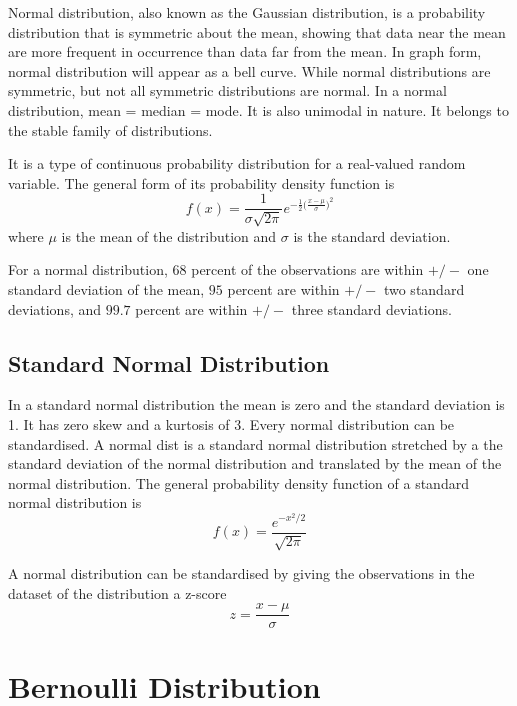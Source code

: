 \documentclass[14pt, a4paper]{article}
\theoremstyle{definition}
\begin{document}
  
Normal distribution, also known as the Gaussian distribution, is a probability distribution that is symmetric about the mean, showing that data near the mean are more frequent in occurrence than data far from the mean. In graph form, normal distribution will appear as a bell curve. While normal distributions are symmetric, but not all symmetric distributions are normal. In a normal distribution, mean = median = mode. It is also unimodal in nature. It belongs to the stable family of distributions.

It is a type of continuous probability distribution for a real-valued random variable. The general form of its probability density function is 
\[ f(x) = \frac{1}{\sigma \sqrt{2 \pi } } e^{ - \frac{1}{2} \big( \frac{x-\mu}{\sigma} \big) ^2 }  \]
where $\mu$ is the mean of the distribution and $\sigma$ is the standard deviation.

For a normal distribution, $68$ percent of the observations are within $+/-$ one standard deviation of the mean, $95$ percent are within $+/-$ two standard deviations, and $99.7$ percent are within $+/-$ three standard deviations.


\subsection{Standard Normal Distribution}
In a standard normal distribution the mean is zero and the standard deviation is 1. It has zero skew and a kurtosis of 3. Every normal distribution can be standardised. A normal dist is a standard normal distribution stretched by a the standard deviation of the normal distribution and translated by the mean of the normal distribution. The general probability density function of a standard normal distribution is 
\[ f(x) = \frac{e^{-x^2 / 2}}{\sqrt{2 \pi} } \]

A normal distribution can be standardised by giving the observations in the dataset of the distribution a z-score 
\[ z = \frac{x - \mu}{\sigma}\]

\section{Bernoulli Distribution}
\end{document}
